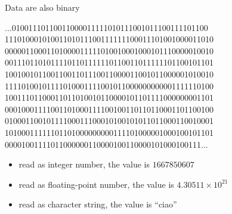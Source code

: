 \begin{frame}[fragile]{Data are also binary}

  \begin{semiverbatim}
{\color{gray}...01001110110011000011111010111001011100111101100
11101000101001101011100111111100011101001000011010
00000110001101000011111010010001000101110000010010
00111011010111101101111110110011011111101100101101
10010010110011001101110011000011001011000001010010
11110100101111010001111001011000000000001111110100
10011101100011011010010110000101101111000000001101
00010001111001101000111100100110110110001101100100
01000110010111100011100010100101011011000110010001
10100011111101101000000000111101000001000100101101
00001001111011000000110000100110000101000100111...}\end{semiverbatim}


\begin{itemize}
\item<3-> read as \alert<3>{integer number}, the value is $1667850607$
\item<4-> read as \alert<4>{floating-point number}, the value is $4.30511 \times 10^{21}$
\item<5-> read as \alert<5>{character string}, the value is ``ciao''
\end{itemize}
\end{frame}

